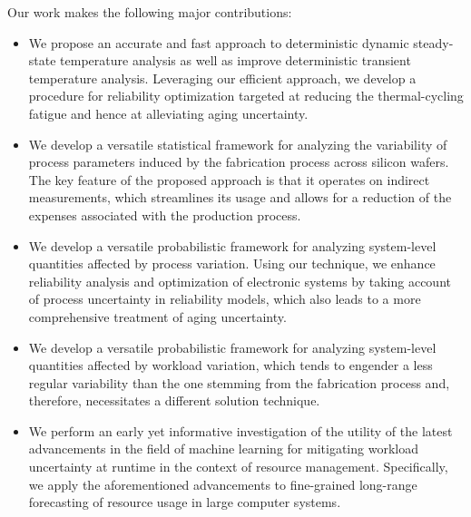 Our work makes the following major contributions:

\begin{itemize}

\item
We propose an accurate and fast approach to deterministic dynamic steady-state
temperature analysis as well as improve deterministic transient temperature
analysis. Leveraging our efficient approach, we develop a procedure for
reliability optimization targeted at reducing the thermal-cycling fatigue and
hence at alleviating aging uncertainty.

\item
We develop a versatile statistical framework for analyzing the variability of
process parameters induced by the fabrication process across silicon wafers. The
key feature of the proposed approach is that it operates on indirect
measurements, which streamlines its usage and allows for a reduction of the
expenses associated with the production process.

\item
We develop a versatile probabilistic framework for analyzing system-level
quantities affected by process variation. Using our technique, we enhance
reliability analysis and optimization of electronic systems by taking account of
process uncertainty in reliability models, which also leads to a more
comprehensive treatment of aging uncertainty.

\item
We develop a versatile probabilistic framework for analyzing system-level
quantities affected by workload variation, which tends to engender a less
regular variability than the one stemming from the fabrication process and,
therefore, necessitates a different solution technique.

\item
We perform an early yet informative investigation of the utility of the latest
advancements in the field of machine learning for mitigating workload
uncertainty at runtime in the context of resource management. Specifically, we
apply the aforementioned advancements to fine-grained long-range forecasting of
resource usage in large computer systems.

\end{itemize}
